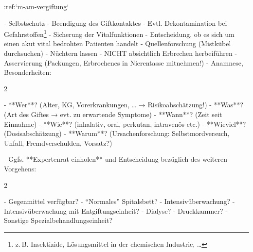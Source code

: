 :ref:`m-am-vergiftung`
\begin{enumerate}
  -   Selbstschutz
  -   Beendigung des Giftkontaktes
  -   Evtl. Dekontamination bei
  Gefahrstoffen\footnote{z. B. Insektizide, Lösungsmittel
  in der chemischen Industrie, \ldots}
  -   Sicherung der Vitalfunktionen
  -   Entscheidung, ob es sich um einen akut vital
  bedrohten Patienten handelt
  -   Quellenforschung (Mistkübel
  durchsuchen)
  -   Nüchtern lassen
  -   NICHT absichtlich Erbrechen
  herbeiführen
  -   Asservierung (Packungen, Erbrochenes in
  Nierentasse mitnehmen!)
  -   Anamnese, Besonderheiten:
  \begin{multicols}{2}
  \begin{enumerate}\raggedbottom
    -   **Wer**? (Alter, KG, Vorerkrankungen, \ldots
    → Risikoabschätzung!)
    -   **Was**? (Art des Giftes → evt.
    zu erwartende Symptome)
    -   **Wann**? (Zeit seit Einnahme)
    -   **Wie**?
    (inhalativ, oral, perkutan, intravenös etc.)
    -   **Wieviel**? (Dosisabschätzung)
    -   **Warum**? (Ursachenforschung:
    Selbst\-mord\-ver\-such, Unfall, Fremdverschulden,
    Vorsatz?)
  \end{enumerate}
  \end{multicols}
  -   Ggfs. **Expertenrat einholen** und Entscheidung
  bezüglich des weiteren Vorgehens:
  \begin{multicols}{2}
  \begin{enumerate}\raggedbottom
    -   Gegenmittel verfügbar?
    -   \enquote{Normales} Spitalsbett?
    -   Intensivüberwachung?
    -   Intensivüberwachung mit Entgiftungseinheit?
    -   Dialyse?
    -   Druckkammer?
    -   Sonstige Spezialbehandlungseinheit?
  \end{enumerate}
  \end{multicols}
\end{enumerate}